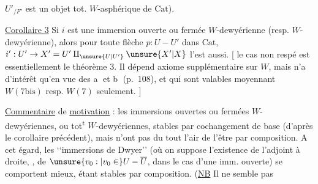 $U'_{/F'}$ est un objet tot. $W$-asphérique de $\mathrm{Cat}$).

\uline{Corollaire 3}  Si $i$ est une immersion ouverte ou fermée $W$-dewyérienne (resp.  $W$-dewyérienne), alors pour toute flèche $p:U-U'$ dans $\mathrm{Cat}$, $i':U'\to X'=U'\amalg_{\unsure{U|U'}}\unsure{X'|X}$ l'est aussi. [ le cas non respé est essentiellement le théorème 3. Il  dépend  axiome supplémentaire sur $W$, mais n'a d'intérêt qu'en vue des  \textcircled{a} et \textcircled{b} (p.~108), et qui sont valables moyennant $W(7\mathrm{bis})$ resp. $W(7)$ seulement. ]

\uline{Commentaire} de \uline{motivation} : les immersions ouvertes ou fermées $W$-dewyériennes, ou  tot\textsuperscript{t} $W$-dewyériennes,   stables par cochangement de base (d'après le corollaire précédent), mais n'ont pas du tout l'air de l'être par composition. A cet égard, les \lq\lq immersions de Dwyer\rq\rq{} (où on suppose l'existence de l'adjoint à droite,  , de $\unsure{v_0:|v_0\in} U-\overline U$, dans le cas d'une imm. ouverte) se comportent mieux, étant stables par composition. (\uline{NB} Il ne semble pas
